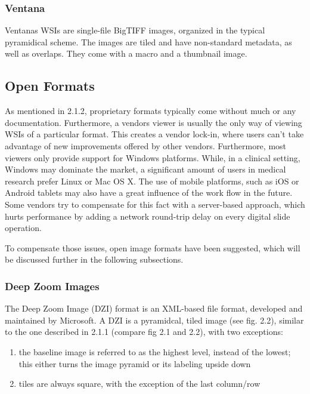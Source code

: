 \subsubsection{Ventana}
Ventanas WSIs are single-file BigTIFF images, organized in the typical pyramidical scheme. The images are tiled and have non-standard metadata, as well as overlaps. They come with a macro and a thumbnail image\cite{web:openslide}.

	
\subsection{Open Formats}
As mentioned in 2.1.2, proprietary formats typically come without much or any documentation. Furthermore, a vendors viewer is usually the only way of viewing WSIs of a particular format. This creates a vendor lock-in, where users can't take advantage of new improvements offered by other vendors. Furthermore, most viewers only provide support for Windows platforms. While, in a clinical setting, Windows may dominate the market, a significant amount of users in medical research prefer Linux or Mac OS X\cite{Goode13}. The use of mobile platforms, such as iOS or Android tablets may also have a great influence of the work flow in the future. Some vendors try to compensate for this fact with a server-based approach, which hurts performance by adding a network round-trip delay on every digital slide operation\cite{Goode13}.

To compensate those issues, open image formats have been suggested, which will be discussed further in the following subsections.


\subsubsection{Deep Zoom Images}
The Deep Zoom Image (DZI) format is an XML-based file format, developed and maintained by Microsoft\cite{web:dzi}. A DZI is a pyramidcal, tiled image (see fig. 2.2), similar to the one described in 2.1.1 (compare fig 2.1 and 2.2), with two exceptions:
\begin{enumerate}
	\item the baseline image is referred to as the highest level, instead of the lowest; this either turns the image pyramid or its labeling upside down
	\item tiles are always square, with the exception of the last column/row
\end{enumerate}

